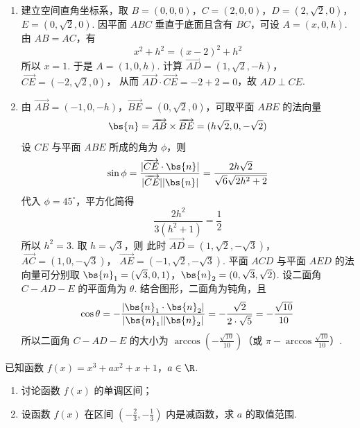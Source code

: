 \begin{solution}
\begin{enumerate}
\item 建立空间直角坐标系，取 \(B=(0,0,0)\)，\(C=(2,0,0)\)，\(D=(2,\sqrt{2},0)\)，\(E=(0,\sqrt{2},0)\). 因平面 \(ABC\) 垂直于底面且含有 \(BC\)，可设 \(A=(x,0,h)\). 由 \(AB=AC\)，有
\[
x^2+h^2=(x-2)^2+h^2
\]
所以 \(x=1\). 于是 \(A=(1,0,h)\). 计算
\(\overrightarrow{AD}=(1,\sqrt{2},-h)\)，\(\overrightarrow{CE}=(-2,\sqrt{2},0)\)，
从而 \(\overrightarrow{AD}\cdot\overrightarrow{CE}=-2+2=0\)，故 \(AD\perp CE\).
\item 由 \(\overrightarrow{AB}=(-1,0,-h)\)，\(\overrightarrow{BE}=(0,\sqrt{2},0)\)，可取平面 \(ABE\) 的法向量
\[
\bs{n}=\overrightarrow{AB}\times\overrightarrow{BE}=(h\sqrt{2},0,-\sqrt{2})
\]
设 \(CE\) 与平面 \(ABE\) 所成的角为 \(\phi\)，则
\[
\sin\phi=\frac{|\overrightarrow{CE}\cdot\bs{n}|}{|\overrightarrow{CE}||\bs{n}|}
=\frac{2h\sqrt{2}}{\sqrt{6}\sqrt{2h^2+2}}
\]
代入 \(\phi=45^{\circ}\)，平方化简得
\[
\frac{2h^2}{3(h^2+1)}=\frac{1}{2}
\]
所以 \(h^2=3\). 取 \(h=\sqrt{3}\)，则
此时 \(\overrightarrow{AD}=(1,\sqrt{2},-\sqrt{3})\)，
\(\overrightarrow{AC}=(1,0,-\sqrt{3})\)，
\(\overrightarrow{AE}=(-1,\sqrt{2},-\sqrt{3})\).
平面 \(ACD\) 与平面 \(AED\) 的法向量可分别取
\(\bs{n}_1=(\sqrt{3},0,1)\)，\(\bs{n}_2=(0,\sqrt{3},\sqrt{2})\).
设二面角 \(C-AD-E\) 的平面角为 \(\theta\). 结合图形，二面角为钝角，且
\[
\cos\theta=-\frac{|\bs{n}_1\cdot\bs{n}_2|}{|\bs{n}_1||\bs{n}_2|}=-\frac{\sqrt{2}}{2\cdot\sqrt{5}}=-\frac{\sqrt{10}}{10}
\]
所以二面角 \(C-AD-E\) 的大小为 \(\arccos\left(-\frac{\sqrt{10}}{10}\right)\)（或 \(\pi-\arccos\frac{\sqrt{10}}{10}\)）.
\end{enumerate}
\end{solution}

\begin{problem}
已知函数 \(f(x) = x^3 + ax^2 + x + 1\)，\(a \in \R\).

\begin{enumerate}
\item 讨论函数 \( f(x) \) 的单调区间；
\item 设函数 \( f(x) \) 在区间 \( \left(-\frac{2}{3}, -\frac{1}{3}\right) \) 内是减函数，求 \( a \) 的取值范围.
\end{enumerate}
\end{problem}

